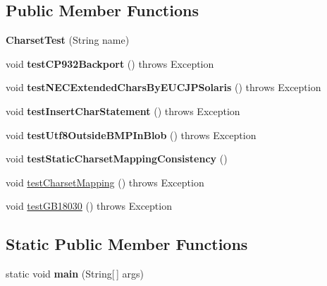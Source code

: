 \subsection*{Public Member Functions}
\begin{DoxyCompactItemize}
\item 
\mbox{\label{classtestsuite_1_1simple_1_1_charset_test_a6c41126f4f1e57b55d853cf3d7c55155}} 
{\bfseries Charset\+Test} (String name)
\item 
\mbox{\label{classtestsuite_1_1simple_1_1_charset_test_a7c62b0525cd9efee8029643a749d3c18}} 
void {\bfseries test\+C\+P932\+Backport} ()  throws Exception 
\item 
\mbox{\label{classtestsuite_1_1simple_1_1_charset_test_a628f2a4dec5304244c9b100cc0fd2c4a}} 
void {\bfseries test\+N\+E\+C\+Extended\+Chars\+By\+E\+U\+C\+J\+P\+Solaris} ()  throws Exception 
\item 
\mbox{\label{classtestsuite_1_1simple_1_1_charset_test_abc30bd84bed2b0038ddd200e11c29a76}} 
void {\bfseries test\+Insert\+Char\+Statement} ()  throws Exception 
\item 
\mbox{\label{classtestsuite_1_1simple_1_1_charset_test_a61abb9d278871369a4193d3a1139e884}} 
void {\bfseries test\+Utf8\+Outside\+B\+M\+P\+In\+Blob} ()  throws Exception 
\item 
\mbox{\label{classtestsuite_1_1simple_1_1_charset_test_a055fafb213fa7c790eff0c58414c9579}} 
void {\bfseries test\+Static\+Charset\+Mapping\+Consistency} ()
\item 
void \mbox{\hyperlink{classtestsuite_1_1simple_1_1_charset_test_ace6046bed9bc3e29734e98003258fd58}{test\+Charset\+Mapping}} ()  throws Exception 
\item 
void \mbox{\hyperlink{classtestsuite_1_1simple_1_1_charset_test_a6fa2cb7372e754c7a783af4cba1cbd17}{test\+G\+B18030}} ()  throws Exception 
\end{DoxyCompactItemize}
\subsection*{Static Public Member Functions}
\begin{DoxyCompactItemize}
\item 
\mbox{\label{classtestsuite_1_1simple_1_1_charset_test_a3413e56bcb53af4a9f65a650fb408b47}} 
static void {\bfseries main} (String\mbox{[}$\,$\mbox{]} args)
\end{DoxyCompactItemize}
